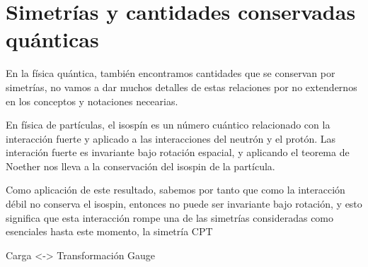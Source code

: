 
\chapter{Simetrías y cantidades conservadas quánticas}
En la física quántica, también encontramos cantidades que se conservan por simetrías, no vamos a dar muchos detalles de estas relaciones por no extendernos en los conceptos y notaciones necearias.

En física de partículas, el isospín es un número cuántico relacionado con la interacción fuerte y aplicado a las interacciones del neutrón y el protón.
Las interación fuerte es invariante bajo rotación espacial, y aplicando el teorema de Noether nos lleva a la conservación del isospin de la partícula.

Como aplicación de este resultado, sabemos por tanto que como la interacción débil no conserva el isospin, entonces no puede ser invariante bajo rotación, y esto significa que esta interacción rompe una de las simetrías consideradas como esenciales hasta este momento, la simetría CPT

Carga <-> Transformación Gauge